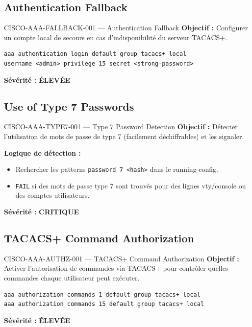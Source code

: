 \documentclass[12pt, a4paper]{report}
\begin{document}
\subsection{Authentication Fallback}

\begin{rulebox}{CISCO-AAA-FALLBACK-001 — Authentication Fallback}
  \textbf{Objectif :} Configurer un compte local de secours en cas d'indisponibilité du serveur TACACS+.

  \begin{lstlisting}
aaa authentication login default group tacacs+ local
username <admin> privilege 15 secret <strong-password>
  \end{lstlisting}

  \textbf{Sévérité :} \textcolor{accentOrange}{\textbf{ÉLEVÉE}}
\end{rulebox}

\subsection{Use of Type 7 Passwords}

\begin{rulebox}{CISCO-AAA-TYPE7-001 — Type 7 Password Detection}
  \textbf{Objectif :} Détecter l'utilisation de mots de passe de type 7 (facilement déchiffrables) et les signaler.

  \textbf{Logique de détection :}
  \begin{itemize}
    \item Rechercher les patterns \texttt{password 7 <hash>} dans le running-config.
    \item \texttt{FAIL} si des mots de passe type 7 sont trouvés pour des lignes vty/console ou des comptes utilisateurs.
  \end{itemize}

  \textbf{Sévérité :} \textcolor{accentRed}{\textbf{CRITIQUE}}
\end{rulebox}

\subsection{TACACS+ Command Authorization}

\begin{rulebox}{CISCO-AAA-AUTHZ-001 — TACACS+ Command Authorization}
  \textbf{Objectif :} Activer l'autorisation de commandes via TACACS+ pour contrôler quelles commandes chaque utilisateur peut exécuter.

  \begin{lstlisting}
aaa authorization commands 1 default group tacacs+ local
aaa authorization commands 15 default group tacacs+ local
  \end{lstlisting}

  \textbf{Sévérité :} \textcolor{accentOrange}{\textbf{ÉLEVÉE}}
\end{rulebox}
\end{document}
